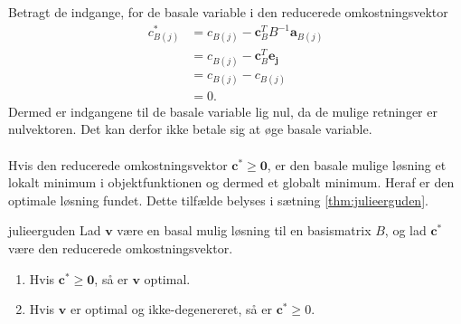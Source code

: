 %
Betragt de indgange, for de basale variable i den reducerede omkostningsvektor
%
\begin{align*}
c^*_{B(j)} & = c_{B(j)} - \mathbf{c}_B^T B^{-1} \mathbf{a}_{B(j)} \\
& = c_{B(j)} - \mathbf{c}_B^T \mathbf{e_j} \\
& = c_{B(j)} -  c_{B(j)}  \\
& = 0.
\end{align*}
%
Dermed er indgangene til de basale variable lig nul, da de mulige retninger er nulvektoren. 
Det kan derfor ikke betale sig at øge basale variable.
\\\\
Hvis den reducerede omkostningsvektor $\mathbf{c}^* \geq \mathbf{0}$, er den basale mulige løsning et lokalt minimum i objektfunktionen og dermed et globalt minimum. Heraf er den optimale løsning fundet. Dette tilfælde belyses i sætning \ref{thm:julieerguden}.
%
\begin{thm}{}{julieerguden}
Lad $\mathbf{v}$ være en basal mulig løsning til en basismatrix $B$, og lad $\mathbf{c}^*$ være den reducerede omkostningsvektor. 
\begin{enumerate}[label = (\alph*)]
\item Hvis $\mathbf{c}^* \geq \textbf{0}$, så er $\mathbf{v}$ optimal.
\item Hvis $\mathbf{v}$ er optimal og ikke-degenereret, så er $\mathbf{c}^* \geq 0$.
\end{enumerate}
\end{thm}
%

